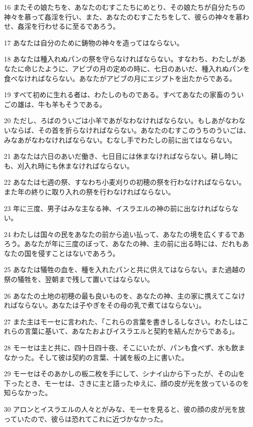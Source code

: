 \par 16 またその娘たちを、あなたのむすこたちにめとり、その娘たちが自分たちの神々を慕って姦淫を行い、また、あなたのむすこたちをして、彼らの神々を慕わせ、姦淫を行わせるに至るであろう。
\par 17 あなたは自分のために鋳物の神々を造ってはならない。
\par 18 あなたは種入れぬパンの祭を守らなければならない。すなわち、わたしがあなたに命じたように、アビブの月の定めの時に、七日のあいだ、種入れぬパンを食べなければならない。あなたがアビブの月にエジプトを出たからである。
\par 19 すべて初めに生れる者は、わたしのものである。すべてあなたの家畜のういごの雄は、牛も羊もそうである。
\par 20 ただし、ろばのういごは小羊であがなわなければならない。もしあがなわないならば、その首を折らなければならない。あなたのむすこのうちのういごは、みなあがなわなければならない。むなし手でわたしの前に出てはならない。
\par 21 あなたは六日のあいだ働き、七日目には休まなければならない。耕し時にも、刈入れ時にも休まなければならない。
\par 22 あなたは七週の祭、すなわち小麦刈りの初穂の祭を行わなければならない。また年の終りに取り入れの祭を行わなければならない。
\par 23 年に三度、男子はみな主なる神、イスラエルの神の前に出なければならない。
\par 24 わたしは国々の民をあなたの前から追い払って、あなたの境を広くするであろう。あなたが年に三度のぼって、あなたの神、主の前に出る時には、だれもあなたの国を侵すことはないであろう。
\par 25 あなたは犠牲の血を、種を入れたパンと共に供えてはならない。また過越の祭の犠牲を、翌朝まで残して置いてはならない。
\par 26 あなたの土地の初穂の最も良いものを、あなたの神、主の家に携えてこなければならない。あなたは子やぎをその母の乳で煮てはならない」。
\par 27 また主はモーセに言われた、「これらの言葉を書きしるしなさい。わたしはこれらの言葉に基いて、あなたおよびイスラエルと契約を結んだからである」。
\par 28 モーセは主と共に、四十日四十夜、そこにいたが、パンも食べず、水も飲まなかった。そして彼は契約の言葉、十誡を板の上に書いた。
\par 29 モーセはそのあかしの板二枚を手にして、シナイ山から下ったが、その山を下ったとき、モーセは、さきに主と語ったゆえに、顔の皮が光を放っているのを知らなかった。
\par 30 アロンとイスラエルの人々とがみな、モーセを見ると、彼の顔の皮が光を放っていたので、彼らは恐れてこれに近づかなかった。
